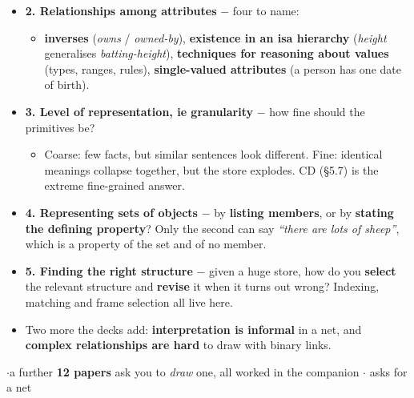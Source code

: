 {\begin{itemize}
\begin{itemize}
          them. This is the expected answer, not a shrug.
  \end{itemize}
  \item \textbf{2. Relationships among attributes} $-$ four to name:
  \begin{itemize}
    \item \textbf{inverses} (\emph{owns} / \emph{owned-by}),
          \textbf{existence in an isa hierarchy} (\emph{height} generalises
          \emph{batting-height}), \textbf{techniques for reasoning about values}
          (types, ranges, rules), \textbf{single-valued attributes} (a person has one
          date of birth).
  \end{itemize}
  \item \textbf{3. Level of representation, ie granularity} $-$ how fine should the
        primitives be?
  \begin{itemize}
    \item Coarse: few facts, but similar sentences look different.
          Fine: identical meanings collapse together, but the store explodes.
          CD (\S5.7) is the extreme fine-grained answer.
  \end{itemize}
  \item \textbf{4. Representing sets of objects} $-$ by \textbf{listing members}, or by
        \textbf{stating the defining property}? Only the second can say
        \emph{``there are lots of sheep''}, which is a property of the set and of no
        member.
  \item \textbf{5. Finding the right structure} $-$ given a huge store, how do you
        \textbf{select} the relevant structure and \textbf{revise} it when it turns out
        wrong? Indexing, matching and frame selection all live here.
  \item Two more the decks add: \textbf{interpretation is informal} in a net, and
        \textbf{complex relationships are hard} to draw with binary links.
\end{itemize}}


{\color{sub}\footnotesize {} 
\gap$\cdot$\gap a further \textbf{12 papers} ask you to \emph{draw} one, all worked in
the companion \gap$\cdot$\gap {} asks for a net
}

